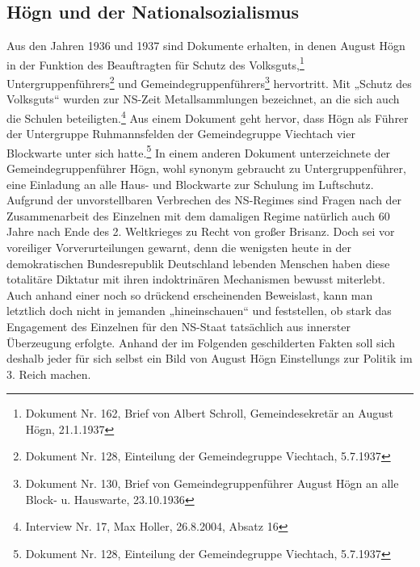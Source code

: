 \documentclass[a4paper]{article}
\begin{document}
\subsection{Högn und der Nationalsozialismus}
\label{bkm:Ref99597687}\hypertarget{RefHeadingToc100333734}{}\label{bkm:Ref99597697}\label{bkm:Ref99597694}Aus
den Jahren 1936 und 1937 sind Dokumente erhalten, in denen August Högn
in der Funktion des Beauftragten für {\textquotedbl}Schutz des
Volksguts{\textquotedbl},\footnote{ Dokument Nr. 162, Brief von Albert
Schroll, Gemeindesekretär an August Högn, 21.1.1937}
Untergruppenführers\footnote{ Dokument Nr. 128, Einteilung der
Gemeindegruppe Viechtach, 5.7.1937} und
Gemeindegruppenführers\footnote{ Dokument Nr. 130, Brief von
Gemeindegruppenführer August Högn an alle Block- u. Hauswarte,
23.10.1936} hervortritt. Mit „Schutz des Volksguts“ wurden zur NS-Zeit
Metallsammlungen bezeichnet, an die sich auch die Schulen
beteiligten.\footnote{ Interview Nr. 17, Max Holler, 26.8.2004, Absatz
16} Aus einem Dokument geht hervor, dass Högn als Führer der
Untergruppe Ruhmannsfelden der Gemeindegruppe Viechtach vier Blockwarte
unter sich hatte.\footnote{ Dokument Nr. 128, Einteilung der
Gemeindegruppe Viechtach, 5.7.1937} In einem anderen Dokument
unterzeichnete der Gemeindegruppenführer Högn, wohl synonym gebraucht
zu Untergruppenführer, eine Einladung an alle Haus- und Blockwarte zur
Schulung im Luftschutz. Aufgrund der unvorstellbaren Verbrechen des
NS-Regimes sind Fragen nach der Zusammenarbeit des Einzelnen mit dem
damaligen Regime natürlich auch 60 Jahre nach Ende des 2. Weltkrieges
zu Recht von großer Brisanz. Doch sei vor voreiliger Vorverurteilungen
gewarnt, denn die wenigsten heute in der demokratischen Bundesrepublik
Deutschland lebenden Menschen haben diese totalitäre Diktatur mit ihren
indoktrinären Mechanismen bewusst miterlebt. Auch anhand einer noch so
drückend erscheinenden Beweislast, kann man letztlich doch nicht in
jemanden „hineinschauen“ und feststellen, ob stark das Engagement des
Einzelnen für den NS-Staat tatsächlich aus innerster Überzeugung
erfolgte. Anhand der im Folgenden geschilderten Fakten soll sich
deshalb jeder für sich selbst ein Bild von August Högn Einstellungs zur
Politik im 3. Reich machen.
\end{document}
